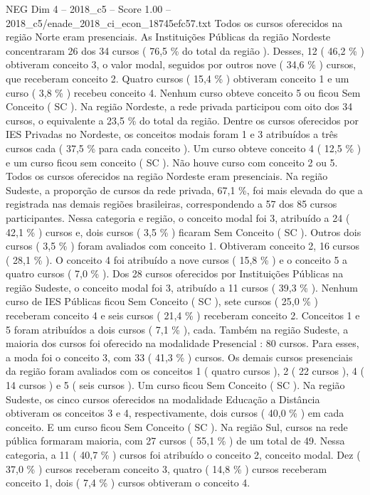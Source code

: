 \begin{textsample}{NEG Dim 4 – 2018\_c5 – Score 1.00 – 2018\_c5/enade\_2018\_ci\_econ\_18745efc57.txt}
Todos os cursos oferecidos na região Norte eram presenciais.
As Instituições Públicas da região Nordeste concentraram 26 dos 34 cursos ( 76,5 \% do total da região ).
Desses, 12 ( 46,2 \% ) obtiveram conceito 3, o valor modal, seguidos por outros nove ( 34,6 \% ) cursos, que receberam conceito 2.
Quatro cursos ( 15,4 \% ) obtiveram conceito 1 e um curso ( 3,8 \% ) recebeu conceito 4.
Nenhum curso obteve conceito 5 ou ficou Sem Conceito ( SC ).
Na região Nordeste, a rede privada participou com oito dos 34 cursos, o equivalente a 23,5 \% do total da região.
Dentre os cursos oferecidos por IES Privadas no Nordeste, os conceitos modais foram 1 e 3 atribuídos a três cursos cada ( 37,5 \% para cada conceito ).
Um curso obteve conceito 4 ( 12,5 \% ) e um curso ficou sem conceito ( SC ).
Não houve curso com conceito 2 ou 5.
Todos os cursos oferecidos na região Nordeste eram presenciais.
Na região Sudeste, a proporção de cursos da rede privada, 67,1 \%, foi mais elevada do que a registrada nas demais regiões brasileiras, correspondendo a 57 dos 85 cursos participantes.
Nessa categoria e região, o conceito modal foi 3, atribuído a 24 ( 42,1 \% ) cursos e, dois cursos ( 3,5 \% ) ficaram Sem Conceito ( SC ).
Outros dois cursos ( 3,5 \% ) foram avaliados com conceito 1.
Obtiveram conceito 2, 16 cursos ( 28,1 \% ).
O conceito 4 foi atribuído a nove cursos ( 15,8 \% ) e o conceito 5 a quatro cursos ( 7,0 \% ).
Dos 28 cursos oferecidos por Instituições Públicas na região Sudeste, o conceito modal foi 3, atribuído a 11 cursos ( 39,3 \% ).
Nenhum curso de IES Públicas ficou Sem Conceito ( SC ), sete cursos ( 25,0 \% ) receberam conceito 4 e seis cursos ( 21,4 \% ) receberam conceito 2.
Conceitos 1 e 5 foram atribuídos a dois cursos ( 7,1 \% ), cada.
Também na região Sudeste, a maioria dos cursos foi oferecido na modalidade Presencial : 80 cursos.
Para esses, a moda foi o conceito 3, com 33 ( 41,3 \% ) cursos.
Os demais cursos presenciais da região foram avaliados com os conceitos 1 ( quatro cursos ), 2 ( 22 cursos ), 4 ( 14 cursos ) e 5 ( seis cursos ).
Um curso ficou Sem Conceito ( SC ).
Na região Sudeste, os cinco cursos oferecidos na modalidade Educação a Distância obtiveram os conceitos 3 e 4, respectivamente, dois cursos ( 40,0 \% ) em cada conceito.
E um curso ficou Sem Conceito ( SC ).
Na região Sul, cursos na rede pública formaram maioria, com 27 cursos ( 55,1 \% ) de um total de 49.
Nessa categoria, a 11 ( 40,7 \% ) cursos foi atribuído o conceito 2, conceito modal.
Dez ( 37,0 \% ) cursos receberam conceito 3, quatro ( 14,8 \% ) cursos receberam conceito 1, dois ( 7,4 \% ) cursos obtiveram o conceito 4.

\end{textsample}
